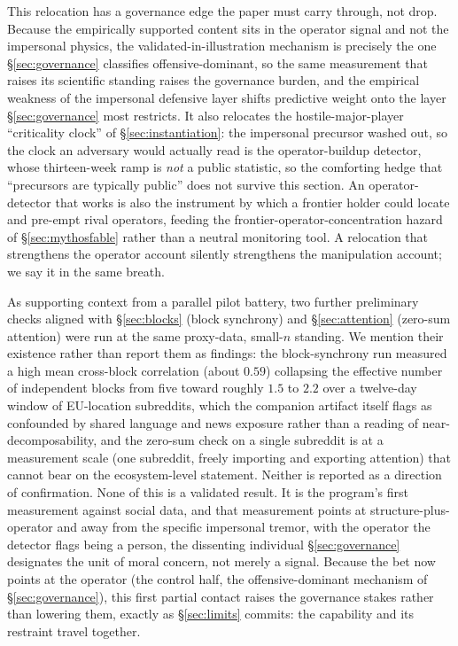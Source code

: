 \documentclass[11pt]{article}
\begin{document}
This relocation has a governance edge the paper must carry through, not drop. Because the empirically supported content sits in the operator signal and not the impersonal physics, the validated-in-illustration mechanism is precisely the one \S\ref{sec:governance} classifies offensive-dominant, so the same measurement that raises its scientific standing raises the governance burden, and the empirical weakness of the impersonal defensive layer shifts predictive weight onto the layer \S\ref{sec:governance} most restricts. It also relocates the hostile-major-player ``criticality clock'' of \S\ref{sec:instantiation}: the impersonal precursor washed out, so the clock an adversary would actually read is the operator-buildup detector, whose thirteen-week ramp is \emph{not} a public statistic, so the comforting hedge that ``precursors are typically public'' does not survive this section. An operator-detector that works is also the instrument by which a frontier holder could locate and pre-empt rival operators, feeding the frontier-operator-concentration hazard of \S\ref{sec:mythosfable} rather than a neutral monitoring tool. A relocation that strengthens the operator account silently strengthens the manipulation account; we say it in the same breath.

As supporting context from a parallel pilot battery, two further preliminary checks aligned with \S\ref{sec:blocks} (block synchrony) and \S\ref{sec:attention} (zero-sum attention) were run at the same proxy-data, small-$n$ standing. We mention their existence rather than report them as findings: the block-synchrony run measured a high mean cross-block correlation (about $0.59$) collapsing the effective number of independent blocks from five toward roughly $1.5$ to $2.2$ over a twelve-day window of EU-location subreddits, which the companion artifact itself flags as confounded by shared language and news exposure rather than a reading of near-decomposability, and the zero-sum check on a single subreddit is at a measurement scale (one subreddit, freely importing and exporting attention) that cannot bear on the ecosystem-level statement. Neither is reported as a direction of confirmation. None of this is a validated result. It is the program's first measurement against social data, and that measurement points at structure-plus-operator and away from the specific impersonal tremor, with the operator the detector flags being a person, the dissenting individual \S\ref{sec:governance} designates the unit of moral concern, not merely a signal. Because the bet now points at the operator (the control half, the offensive-dominant mechanism of \S\ref{sec:governance}), this first partial contact raises the governance stakes rather than lowering them, exactly as \S\ref{sec:limits} commits: the capability and its restraint travel together.
\end{document}
